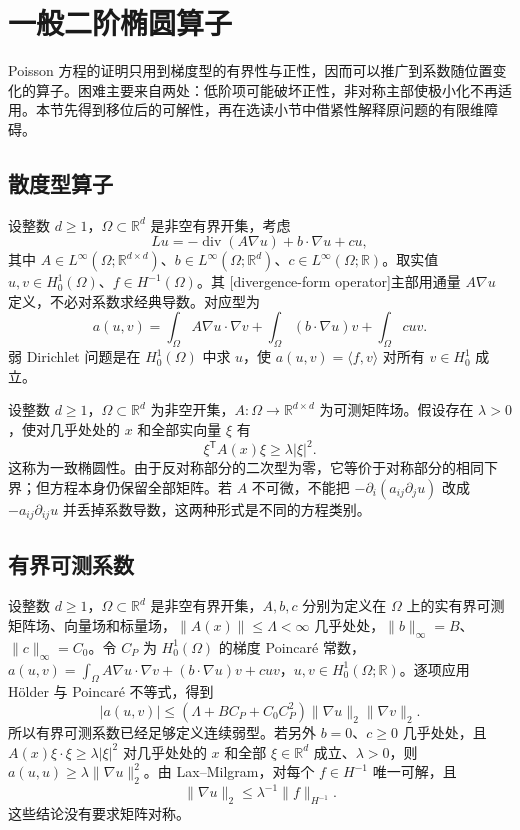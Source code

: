 \section{一般二阶椭圆算子}
\label{b2:sec:1504}

Poisson 方程的证明只用到梯度型的有界性与正性，因而可以推广到系数随位置变化的算子。困难主要来自两处：低阶项可能破坏正性，非对称主部使极小化不再适用。本节先得到移位后的可解性，再在选读小节中借紧性解释原问题的有限维障碍。

\subsection{散度型算子}
\label{b2:subsec:150401}

设整数 \(d\geq1\)，\(\Omega\subset\mathbb R^d\) 是非空有界开集，考虑
\[Lu=-\operatorname{div}(A\nabla u)+b\cdot\nabla u+cu,\]
其中 \(A\in L^\infty(\Omega;\mathbb R^{d\times d})\)、\(b\in L^\infty(\Omega;\mathbb R^d)\)、\(c\in L^\infty(\Omega;\mathbb R)\)。取实值 \(u,v\in H_0^1(\Omega)\)、\(f\in H^{-1}(\Omega)\)。其 [divergence-form operator]主部用通量 \(A\nabla u\) 定义，不必对系数求经典导数。对应型为
\[a(u,v)=\int_\Omega A\nabla u\cdot\nabla v
       +\int_\Omega(b\cdot\nabla u)v+\int_\Omega cuv.
\]
弱 Dirichlet 问题是在 \(H_0^1(\Omega)\) 中求 \(u\)，使 \(a(u,v)=\langle f,v\rangle\) 对所有 \(v\in H_0^1\) 成立。

\ProseParagraphBreak

设整数 \(d\geq1\)，\(\Omega\subset\mathbb R^d\) 为非空开集，\(A:\Omega\to\mathbb R^{d\times d}\) 为可测矩阵场。假设存在 \(\lambda>0\)，使对几乎处处的 \(x\) 和全部实向量 \(\xi\) 有
\[\xi^{\mathsf T}A(x)\xi\ge\lambda|\xi|^2.\]
这称为一致椭圆性。由于反对称部分的二次型为零，它等价于对称部分的相同下界；但方程本身仍保留全部矩阵。若 \(A\) 不可微，不能把 \(-\partial_i(a_{ij}\partial_j u)\) 改成 \(-a_{ij}\partial_{ij}u\) 并丢掉系数导数，这两种形式是不同的方程类别。

\subsection{有界可测系数}
\label{b2:subsec:150402}

设整数 \(d\geq1\)，\(\Omega\subset\mathbb R^d\) 是非空有界开集，\(A,b,c\) 分别为定义在 \(\Omega\) 上的实有界可测矩阵场、向量场和标量场，\(\|A(x)\|\le\Lambda<\infty\) 几乎处处，\(\|b\|_\infty=B\)、\(\|c\|_\infty=C_0\)。令 \(C_P\) 为 \(H_0^1(\Omega)\) 的梯度 Poincaré 常数，\(a(u,v)=\int_\Omega A\nabla u\cdot\nabla v+(b\cdot\nabla u)v+cuv\)，\(u,v\in H_0^1(\Omega;\mathbb R)\)。逐项应用 Hölder 与 Poincaré 不等式，得到
\[|a(u,v)|\le(\Lambda+BC_P+C_0C_P^2)\lVert\nabla u\rVert_2\lVert\nabla v\rVert_2.\]
所以有界可测系数已经足够定义连续弱型。若另外 \(b=0\)、\(c\ge0\) 几乎处处，且 \(A(x)\xi\cdot\xi\ge\lambda|\xi|^2\) 对几乎处处的 \(x\) 和全部 \(\xi\in\mathbb R^d\) 成立、\(\lambda>0\)，则 \(a(u,u)\ge\lambda\lVert\nabla u\rVert_2^2\)。由 Lax--Milgram，对每个 \(f\in H^{-1}\) 唯一可解，且
\[\lVert\nabla u\rVert_2\le\lambda^{-1}\lVert f\rVert_{H^{-1}}.\]
这些结论没有要求矩阵对称。

